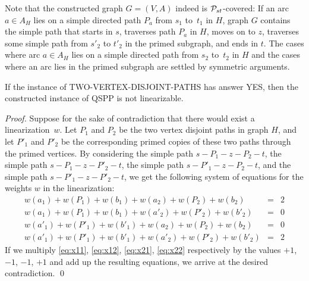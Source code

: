 \documentclass[runningheads]{llncs}
\begin{document}
\begin{appendix}
Note that the constructed graph $G=(V,A)$ indeed is ${\cal P}_{st}$-covered:
If an arc $a\in A_H$ lies on a simple directed path $P_a$ from $s_1$ to~$t_1$ in $H$,
graph $G$ contains the simple path that starts in $s$, traverses path $P_a$ in $H$, moves on to $z$,
traverses some simple path from $s'_2$ to $t'_2$ in the primed subgraph, and ends in $t$.
The cases where arc $a\in A_H$ lies on a simple directed path from $s_2$ to~$t_2$ in $H$
and the cases where an arc lies in the primed subgraph are settled by symmetric arguments.
\begin{lemma}
\label{le:hard.1}
If the instance of TWO-VERTEX-DISJOINT-PATHS has answer YES,
then the constructed instance of QSPP is not linearizable.
\end{lemma}
\begin{proof}
Suppose for the sake of contradiction that there would exist a linearization~$w$.
Let $P_1$ and $P_2$ be the two vertex disjoint paths in graph $H$, and let $P'_1$ and $P'_2$
be the corresponding primed copies of these two paths through the primed vertices.
By considering
the simple path $s-P_1-z-P_2-t$,
the simple path $s-P_1-z-P'_2-t$,
the simple path $s-P'_1-z-P_2-t$, and
the simple path $s-P'_1-z-P'_2-t$,
we get the following system of equations for the weights $w$ in the linearization:
\begin{eqnarray}
w(a_1) +w(P_1 )+w(b_1) +w(a_2) +w(P_2 )+w(b_2)  &=& 2 \label{eq:x11} \\[0.5ex]
w(a_1) +w(P_1 )+w(b_1) +w(a'_2)+w(P'_2)+w(b'_2) &=& 0 \label{eq:x12} \\[0.5ex]
w(a'_1)+w(P'_1)+w(b'_1)+w(a_2) +w(P_2 )+w(b_2)  &=& 0 \label{eq:x21} \\[0.5ex]
w(a'_1)+w(P'_1)+w(b'_1)+w(a'_2)+w(P'_2)+w(b'_2) &=& 2 \label{eq:x22} 
\end{eqnarray}
If we multiply \eqref{eq:x11}, \eqref{eq:x12}, \eqref{eq:x21}, \eqref{eq:x22}
respectively by the values $+1$, $-1$, $-1$, $+1$ and add up the resulting equations,
we arrive at the desired contradiction.
\qed
\end{proof}


\end{appendix}
\end{document}
